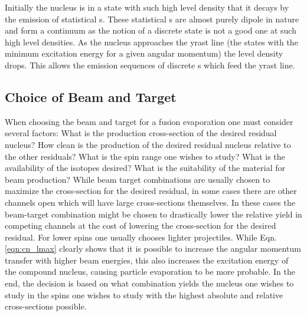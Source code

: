 Initially the nucleus is in a state with such high level density that it decays by the emission of statistical \gr{}s\cite{cnCooling}. These statistical \gr{}s are almost purely dipole in nature and form a continuum as the notion of a discrete state is not a good one at such high level densities. As the nucleus approaches the yrast line (the states with the minimum excitation energy for a given angular momentum) the level density drops. This allows the emission sequences of discrete \gr{}s which feed the yrast line.

\subsection{Choice of Beam and Target}
\label{ssec:exp-pr-fus-evap-beam-target}
When choosing the beam and target for a fusion evaporation one must consider several factors: What is the production cross-section of the desired residual nucleus? How clean is the production of the desired residual nucleus relative to the other residuals? What is the spin range one wishes to study? What is the availability of the isotopes desired? What is the suitability of the material for beam production? While beam target combinations are usually chosen to maximize the cross-section for the desired residual, in some cases there are other channels open which will have large cross-sections themselves. In these cases the beam-target combination might be chosen to drastically lower the relative yield in competing channels at the cost of lowering the cross-section for the desired residual. For lower spins one usually chooses lighter projectiles. While Eqn. \ref{eqn:cn_lmax} clearly shows that it is possible to increase the angular momentum transfer with higher beam energies, this also increases the excitation energy of the compound nucleus, causing particle evaporation to be more probable. In the end, the decision is based on what combination yields the nucleus one wishes to study in the spins one wishes to study with the highest absolute and relative cross-sections possible.

